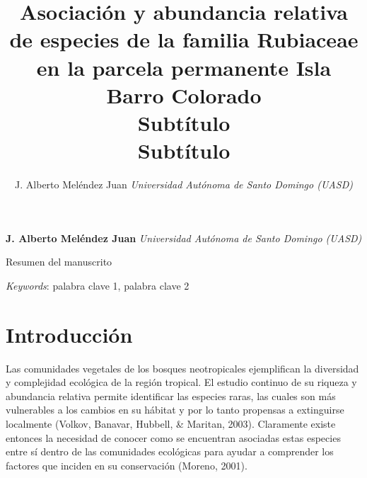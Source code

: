\documentclass[11pt,]{article}
\title{Asociación y abundancia relativa de especies de la familia Rubiaceae en
la parcela permanente Isla Barro Colorado\\
Subtítulo\\
Subtítulo  }
\author{\Large J. Alberto Meléndez Juan\vspace{0.05in} \newline\normalsize\emph{Universidad Autónoma de Santo Domingo (UASD)}  }
\date{}
\newcommand*{\authorfont}{\fontfamily{phv}\selectfont}
\renewenvironment{abstract}
 {{%
    \setlength{\leftmargin}{0mm}
    \setlength{\rightmargin}{\leftmargin}%
  }%
  \relax}
 {\endlist}
\begin{document}
	
%

{%
\setlength{\parindent}{0pt}
\thispagestyle{plain}
{\fontsize{18}{20}\selectfont\raggedright 
\maketitle  %

}

{
   \vskip 13.5pt\relax \normalsize\fontsize{11}{12} 
\textbf{\authorfont J. Alberto Meléndez Juan} \hskip 15pt \emph{\small Universidad Autónoma de Santo Domingo (UASD)}   

}

}








\begin{abstract}

    \hbox{\vrule height .2pt width 39.14pc}

    \vskip 8.5pt %

\noindent Resumen del manuscrito


\vskip 8.5pt \noindent \emph{Keywords}: palabra clave 1, palabra clave 2 \par

    \hbox{\vrule height .2pt width 39.14pc}



\end{abstract}


\vskip 6.5pt


\noindent  \section{Introducción}\label{introducciuxf3n}

Las comunidades vegetales de los bosques neotropicales ejemplifican la
diversidad y complejidad ecológica de la región tropical. El estudio
continuo de su riqueza y abundancia relativa permite identificar las
especies raras, las cuales son más vulnerables a los cambios en su
hábitat y por lo tanto propensas a extinguirse localmente (Volkov,
Banavar, Hubbell, \& Maritan, 2003). Claramente existe entonces la
necesidad de conocer como se encuentran asociadas estas especies entre
sí dentro de las comunidades ecológicas para ayudar a comprender los
factores que inciden en su conservación (Moreno, 2001).
\end{document}
